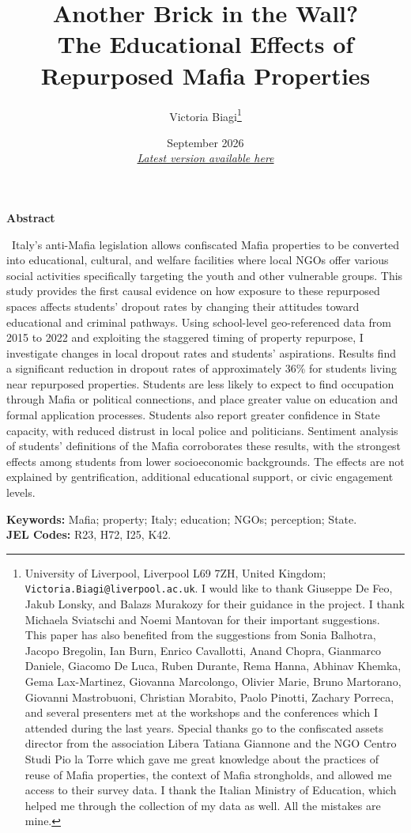 \documentclass[12pt]{article}
\title{\normalfont \Large Another Brick in the Wall? \\ The Educational Effects of Repurposed Mafia Properties}
\author{Victoria Biagi\small{\thanks{University of Liverpool, Liverpool L69 7ZH, United Kingdom; \texttt{Victoria.Biagi@liverpool.ac.uk}. I would like to thank Giuseppe De Feo, Jakub Lonsky, and Balazs Murakozy for their guidance in the project. I thank Michaela Sviatschi and Noemi Mantovan for their important suggestions. This paper has also benefited from the suggestions from Sonia Balhotra, Jacopo Bregolin, Ian Burn, Enrico Cavallotti, Anand Chopra, Gianmarco Daniele, Giacomo De Luca, Ruben Durante, Rema Hanna, Abhinav Khemka, Gema Lax-Martinez, Giovanna Marcolongo, Olivier Marie, Bruno Martorano, Giovanni Mastrobuoni, Christian Morabito, Paolo Pinotti, Zachary Porreca, and several presenters met at the workshops and the conferences which I attended during the last years. Special thanks go to the confiscated assets director from the association Libera Tatiana Giannone and the NGO Centro Studi Pio la Torre which gave me great knowledge about the practices of reuse of Mafia properties, the context of Mafia strongholds, and allowed me access to their survey data. I thank the Italian Ministry of Education, which helped me through the collection of my data as well. All the mistakes are mine.}}}
\date{September 2026 \\[0.3cm]
{\small \href{https://github.com/victoriabiagi/JMP/raw/main/draft_0926.pdf}{\emph{Latest version available here}}}}
\theoremstyle{plain}
\theoremstyle{plain}
\theoremstyle{plain}
\theoremstyle{definition}
\theoremstyle{plain}
\theoremstyle{definition}
\theoremstyle{plain}
\theoremstyle{remark}
\theoremstyle{definition}
\theoremstyle{definition}
\theoremstyle{plain}
\begin{document}
      
\maketitle
\justifying
\vspace{-0.5cm}
 \begin{center}
    \textbf{\large{ \small{Abstract}}} \\ 
 \end{center}
 \vspace{-0.2cm}
  \small{
 Italy's anti-Mafia legislation allows confiscated Mafia properties to be converted into educational, cultural, and welfare facilities where local NGOs offer various social activities specifically targeting the youth and other vulnerable groups. This study provides the first causal evidence on how exposure to these repurposed spaces affects students' dropout rates by changing their attitudes toward educational and criminal pathways. Using school-level geo-referenced data from 2015 to 2022 and exploiting the staggered timing of property repurpose, I investigate changes in local dropout rates and students' aspirations. Results find a significant reduction in dropout rates of approximately 36\% for students living near repurposed properties. Students are less likely to expect to find occupation through Mafia or political connections, and place greater value on education and formal application processes. Students also report greater confidence in State capacity, with reduced distrust in local police and politicians. Sentiment analysis of students' definitions of the Mafia corroborates these results, with the strongest effects among students from lower socioeconomic backgrounds. The effects are not explained by gentrification, additional educational support, or civic engagement levels. } \par


\vspace{0.1cm}
\noindent\small{
\textbf{Keywords:} Mafia; property; Italy; education;  NGOs; perception; State. \\
\textbf{JEL Codes:} R23, H72, I25, K42. }
\newpage
\titleformat{\section}{\normalfont\Large\bfseries}{\thesection}{1em}{}
\titleformat{\subsection}{\normalfont\large\bfseries}{\thesubsection}{1em}{}
\titleformat{\subsubsection}{\normalfont\normalsize\bfseries}{\thesubsubsection}{1em}{}
\end{document}
